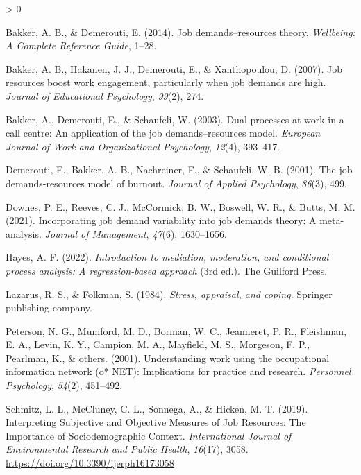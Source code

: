 \documentclass[
  english,
  man]{apa6}
\newlength{\cslhangindent}
\newenvironment{CSLReferences}[2] %
 {%
  \setlength{\parindent}{0pt}
  \ifodd #1 \everypar{\setlength{\hangindent}{\cslhangindent}}\ignorespaces\fi
  \ifnum #2 > 0
  \setlength{\parskip}{#2\baselineskip}
  \fi
 }%
 {}
\begin{document}
\hypertarget{refs}{}
\begin{CSLReferences}{1}{0}
\leavevmode\hypertarget{ref-bakker2014job}{}%
Bakker, A. B., \& Demerouti, E. (2014). Job demands--resources theory. \emph{Wellbeing: A Complete Reference Guide}, 1--28.

\leavevmode\hypertarget{ref-bakker2007job}{}%
Bakker, A. B., Hakanen, J. J., Demerouti, E., \& Xanthopoulou, D. (2007). Job resources boost work engagement, particularly when job demands are high. \emph{Journal of Educational Psychology}, \emph{99}(2), 274.

\leavevmode\hypertarget{ref-bakker2003dual}{}%
Bakker, A., Demerouti, E., \& Schaufeli, W. (2003). Dual processes at work in a call centre: An application of the job demands--resources model. \emph{European Journal of Work and Organizational Psychology}, \emph{12}(4), 393--417.

\leavevmode\hypertarget{ref-demerouti2001job}{}%
Demerouti, E., Bakker, A. B., Nachreiner, F., \& Schaufeli, W. B. (2001). The job demands-resources model of burnout. \emph{Journal of Applied Psychology}, \emph{86}(3), 499.

\leavevmode\hypertarget{ref-downes2021incorporating}{}%
Downes, P. E., Reeves, C. J., McCormick, B. W., Boswell, W. R., \& Butts, M. M. (2021). Incorporating job demand variability into job demands theory: A meta-analysis. \emph{Journal of Management}, \emph{47}(6), 1630--1656.

\leavevmode\hypertarget{ref-hayes2022}{}%
Hayes, A. F. (2022). \emph{Introduction to mediation, moderation, and conditional process analysis: A regression-based approach} (3rd ed.). The Guilford Press.

\leavevmode\hypertarget{ref-lazarus1984stress}{}%
Lazarus, R. S., \& Folkman, S. (1984). \emph{Stress, appraisal, and coping}. Springer publishing company.

\leavevmode\hypertarget{ref-peterson2001understanding}{}%
Peterson, N. G., Mumford, M. D., Borman, W. C., Jeanneret, P. R., Fleishman, E. A., Levin, K. Y., Campion, M. A., Mayfield, M. S., Morgeson, F. P., Pearlman, K., \& others. (2001). Understanding work using the occupational information network (o* NET): Implications for practice and research. \emph{Personnel Psychology}, \emph{54}(2), 451--492.

\leavevmode\hypertarget{ref-schmitz_interpreting_2019}{}%
Schmitz, L. L., McCluney, C. L., Sonnega, A., \& Hicken, M. T. (2019). Interpreting {Subjective} and {Objective} {Measures} of {Job} {Resources}: {The} {Importance} of {Sociodemographic} {Context}. \emph{International Journal of Environmental Research and Public Health}, \emph{16}(17), 3058. \url{https://doi.org/10.3390/ijerph16173058}


\end{CSLReferences}
\end{document}
